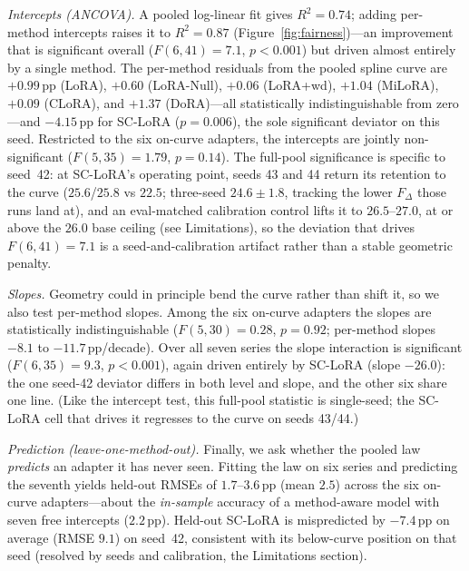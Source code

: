\documentclass[11pt]{article}
\newcommand{\dw}{F_{\Delta}}
\begin{document}
\emph{Intercepts (ANCOVA).} A pooled log-linear fit gives $R^2\!=\!0.74$; adding
per-method intercepts raises it to $R^2\!=\!0.87$
(Figure~\ref{fig:fairness})---an improvement that is significant overall
($F(6,41)\!=\!7.1$, $p\!<\!0.001$) but driven almost entirely by a single method.
The per-method residuals from the pooled spline curve are $+0.99$\,pp (LoRA),
$+0.60$ (LoRA-Null), $+0.06$ (LoRA{+}wd), $+1.04$ (MiLoRA), $+0.09$ (CLoRA), and
$+1.37$ (DoRA)---all statistically indistinguishable from zero---and $-4.15$\,pp
for SC-LoRA ($p\!=\!0.006$), the sole significant deviator on this seed.
Restricted to the six
on-curve adapters, the intercepts are jointly non-significant
($F(5,35)\!=\!1.79$, $p\!=\!0.14$). The full-pool significance is specific to
seed~42: at SC-LoRA's operating point, seeds 43 and 44 return its retention to
the curve ($25.6$/$25.8$ vs $22.5$; three-seed $24.6\!\pm\!1.8$, tracking the
lower $\dw$ those runs land at),
and an eval-matched calibration control lifts it to $26.5$--$27.0$, at or above
the $26.0$ base ceiling
(see Limitations), so the deviation that drives
$F(6,41)\!=\!7.1$ is a seed-and-calibration artifact rather than a stable
geometric penalty.

\emph{Slopes.} Geometry could in principle bend the curve rather than shift it,
so we also test per-method slopes. Among the six on-curve adapters the slopes are
statistically indistinguishable ($F(5,30)\!=\!0.28$, $p\!=\!0.92$; per-method
slopes $-8.1$ to $-11.7$\,pp/decade). Over all seven series the slope interaction
is significant ($F(6,35)\!=\!9.3$, $p\!<\!0.001$), again driven entirely by
SC-LoRA (slope $-26.0$): the one seed-42 deviator differs in both level and
slope, and the other six share one line. (Like the intercept test, this
full-pool statistic is single-seed; the SC-LoRA cell that drives it regresses to
the curve on seeds 43/44.)

\emph{Prediction (leave-one-method-out).} Finally, we ask whether the pooled law
\emph{predicts} an adapter it has never seen. Fitting the law on six series and
predicting the seventh yields held-out RMSEs of $1.7$--$3.6$\,pp (mean $2.5$)
across the six on-curve adapters---about the \emph{in-sample} accuracy of a
method-aware model with seven free intercepts ($2.2$\,pp). Held-out SC-LoRA is
mispredicted by $-7.4$\,pp on average (RMSE $9.1$) on seed~42, consistent with
its below-curve position on that seed (resolved by seeds and calibration,
the Limitations section).
\end{document}

